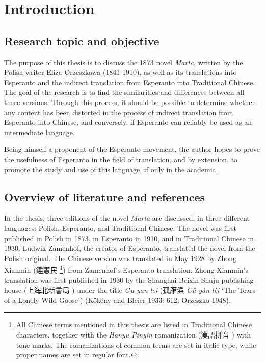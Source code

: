 \chapter{Introduction}

\section{Research topic and objective}
The purpose of this thesis is to discuss the 1873 novel \textit{Marta}, written by the Polish writer Eliza Orzeszkowa (1841-1910), as well as its translations into Esperanto and the indirect translation from Esperanto into Traditional Chinese.
The goal of the research is to find the similarities and differences between all three versions. %
Through this process, it should be possible to determine whether any content has been distorted in the process of indirect translation from Esperanto into Chinese, and conversely, if Esperanto can reliably be used as an intermediate language.

Being himself a proponent of the Esperanto movement, the author hopes to prove the usefulness of Esperanto in the field of translation, and by extension, to promote the study and use of this language, if only in the academia.

\section{Overview of literature and references}
In the thesis, three editions of the novel \textit{Marta} are discussed, in three different languages: Polish, Esperanto, and Traditional Chinese.
The novel was first published in Polish in 1873, in Esperanto in 1910, and in Traditional Chinese in 1930.
Ludwik Zamenhof, the creator of Esperanto, %
translated the novel from the Polish original.
The Chinese version was translated in May 1928 by Zhong Xianmin (錘憲民 %
\footnote{All Chinese terms mentioned in this thesis are listed in Traditional Chinese characters, together with the \textit{Hanyu Pinyin} romanization (漢語拼音 ) with tone marks. The romanizations of common terms are set in italic type, while proper names are set in regular font.}) %
from Zamenhof's Esperanto translation.
Zhong Xianmin's translation was first published in 1930 by the Shanghai Beixin Shuju publishing house (上海北新書局 ) under the title \textit{Gu yan lei} (孤雁淚 \textit{Gū yàn lèi} `The Tears of a Lonely Wild Goose')
(Kökény and Bleier 1933: 612; Orzeszko 1948).

